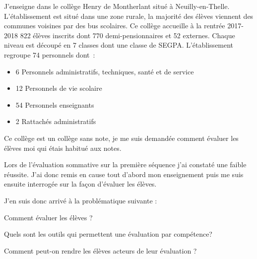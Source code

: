 

J'enseigne dans le collège Henry de Montherlant situé à Neuilly-en-Thelle.
L'établissement est situé dans une zone rurale, la majorité des élèves viennent des communes voisines par des bus scolaires.
Ce collège accueille à la rentrée 2017-2018 822 élèves inscrits dont 770 demi-pensionnaires et 52 externes.
Chaque niveau est découpé en 7 classes dont une classe de SEGPA.
L'établissement regroupe 74 personnels dont~:
\begin{itemize}
\item 6 Personnels administratifs, techniques, santé et de service
\item 12 Personnels de vie scolaire
\item 54 Personnels enseignants
\item 2 Rattachés administratifs
\end{itemize}

Ce collège est un collège sans note, je me suis demandée comment évaluer les élèves moi qui étais habitué aux notes.

Lors de l'évaluation sommative sur la première séquence j'ai constaté une faible réussite.
J'ai donc remis en cause tout d'abord mon enseignement puis me suis ensuite interrogée sur la façon d'évaluer les élèves.

J'en suis donc arrivé à la problématique suivante : 

Comment évaluer les élèves ?

Quels sont les outils qui permettent une évaluation par compétence?

Comment peut-on rendre les élèves acteurs de leur évaluation ?

